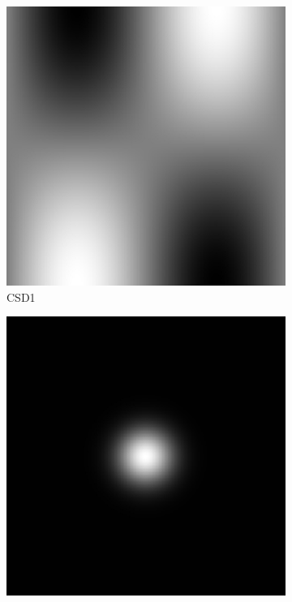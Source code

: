 \documentclass[\main/thesis.tex]{subfiles}
\begin{document}
\begin{figure}[H]
    \centering
    \begin{subfigure}[t]{.25\textwidth}
      \centering
      \includegraphics[width=\textwidth]{images/4_CarcinFunc/Fig1/Func1.jpeg}
      \caption{CSD1}
      \label{fig:CarcinFunc_Func1Distribution}
    \end{subfigure}
    \begin{subfigure}[t]{.25\textwidth}
      \centering
      \includegraphics[width=\textwidth]{images/4_CarcinFunc/Fig1/Func2.jpeg}

\end{subfigure}
\end{figure}
\end{document}
